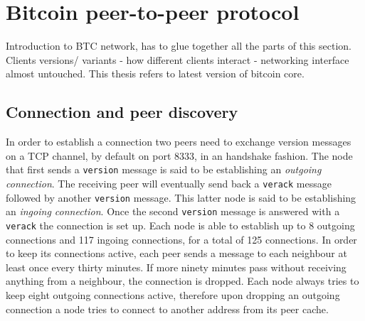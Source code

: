 \documentclass[12pt, letterpaper, twoside]{article}
\title{}
\author{}
\begin{document}
\maketitle

\section{Bitcoin peer-to-peer protocol}\label{netintro}
Introduction to BTC network, has to glue together all the parts of this section. Clients versions/ variants - how different clients interact - networking interface almost untouched. This thesis refers to latest version of bitcoin core.
\subsection{Connection and peer discovery}\label{peerdisc}
In order to establish a connection two peers need to exchange version messages on a TCP channel, by default on port 8333, in an handshake fashion. The node that first sends a \texttt{version} message is said to be establishing an \emph{outgoing connection}. The receiving peer will eventually send back a \texttt{verack} message followed by another \texttt{version} message. This latter node is said to be establishing an \emph{ingoing connection}. Once the second \texttt{version} message is answered with a \texttt{verack} the connection is set up. Each node is able to establish up to 8 outgoing connections and 117 ingoing connections, for a total of 125 connections. In order to keep its connections active, each peer sends a message to each neighbour at least once every thirty minutes. If more ninety minutes pass without receiving anything from a neighbour, the connection is dropped. Each node always tries to keep eight outgoing connections active, therefore upon dropping an outgoing connection a node tries to connect to another address from its peer cache.\\
\end{document}
